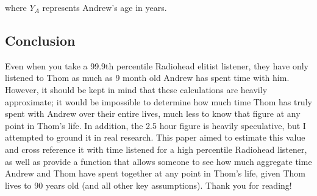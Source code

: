 \documentclass{article}
\begin{document}
where $Y_A$ represents Andrew's age in years. 

\subsection{Conclusion}
Even when you take a 99.9th percentile Radiohead elitist listener, they have only listened to Thom as much as 9 month old Andrew has spent time with him. However, it should be kept in mind that these calculations are heavily approximate; it would be impossible to determine how much time Thom has truly spent with Andrew over their entire lives, much less to know that figure at any point in Thom's life. In addition, the 2.5 hour figure is heavily speculative, but I attempted to ground it in real research. This paper aimed to estimate this value and cross reference it with time listened for a high percentile Radiohead listener, as well as provide a function that allows someone to see how much aggregate time Andrew and Thom have spent together at any point in Thom's life, given Thom lives to 90 years old (and all other key assumptions). Thank you for reading!

\nocite{*}


\end{document}
